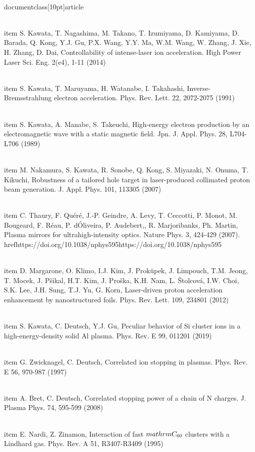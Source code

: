 \\documentclass[10pt]{article}
\begin{document}
{{{{{{  \\item S. Kawata, T. Nagashima, M. Takano, T. Izumiyama, D. Kamiyama, D. Barada, Q. Kong, Y.J. Gu, P.X. Wang, Y.Y. Ma, W.M. Wang, W. Zhang, J. Xie, H. Zhang, D. Dai, Controllability of intense-laser ion acceleration. High Power Laser Sci. Eng. 2(e4), 1-11 (2014)

  \\item S. Kawata, T. Maruyama, H. Watanabe, I. Takahashi, Inverse-Bremsstrahlung electron acceleration. Phys. Rev. Lett. 22, 2072-2075 (1991)

  \\item S. Kawata, A. Manabe, S. Takeuchi, High-energy electron production by an electromagnetic wave with a static magnetic field. Jpn. J. Appl. Phys. 28, L704-L706 (1989)

  \\item M. Nakamura, S. Kawata, R. Sonobe, Q. Kong, S. Miyazaki, N. Onuma, T. Kikuchi, Robustness of a tailored hole target in laser-produced collimated proton beam generation. J. Appl. Phys. 101, 113305 (2007)

  \\item C. Thaury, F. Quéré, J.-P. Geindre, A. Levy, T. Ceccotti, P. Monot, M. Bougeard, F. Réau, P. dÓliveira, P. Audebert,, R. Marjoribanks, Ph. Martin, Plasma mirrors for ultrahigh-intensity optics. Nature Phys. 3, 424-429 (2007). \\href{https://doi.org/10.1038/nphys595}{https://doi.org/10.1038/nphys595}

  \\item D. Margarone, O. Klimo, I.J. Kim, J. Proküpek, J. Limpouch, T.M. Jeong, T. Mocek, J. Pšikal, H.T. Kim, J. Proška, K.H. Nam, L. Štolcová, I.W. Choi, S.K. Lee, J.H. Sung, T.J. Yu, G. Korn, Laser-driven proton acceleration enhancement by nanostructured foils. Phys. Rev. Lett. 109, 234801 (2012)

  \\item S. Kawata, C. Deutsch, Y.J. Gu, Peculiar behavior of Si cluster ions in a high-energy-density solid Al plasma. Phys. Rev. E 99, 011201 (2019)

  \\item G. Zwicknagel, C. Deutsch, Correlated ion stopping in plasmas. Phys. Rev. E 56, 970-987 (1997)

  \\item A. Bret, C. Deutsch, Correlated stopping power of a chain of N charges. J. Plasma Phys. 74, 595-599 (2008)

  \\item E. Nardi, Z. Zinamon, Interaction of fast $\\mathrm{C}_{60}$ clusters with a Lindhard gas. Phys. Rev. A 51, R3407-R3409 (1995)

}}}}}}
\end{document}
